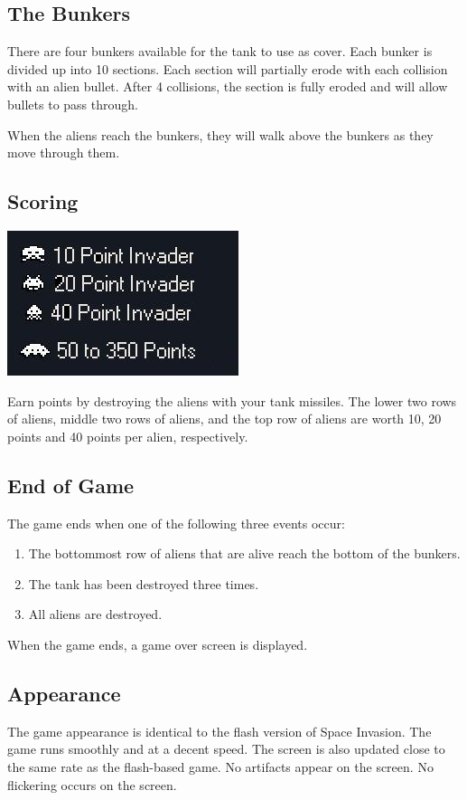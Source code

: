 \documentclass[11pt,letter,oneside]{report}
\begin{document}
\subsection{The Bunkers}
There are four bunkers available for the tank to use as cover.  Each bunker is divided up into 10 sections.  Each section will partially erode with each collision with an alien bullet.  After 4 collisions, the section is fully eroded and will allow bullets to pass through.

When the aliens reach the bunkers, they will walk above the bunkers as they move through them.


\subsection{Scoring}
\includegraphics[]{scoring.jpg}

Earn points by destroying the aliens with your tank missiles. The lower two rows of aliens, middle two rows of aliens, and the top row of aliens are worth 10, 20 points and 40 points per alien, respectively.

\subsection{End of Game}
The game ends when one of the following three events occur:
\begin{enumerate}
\item The bottommost row of aliens that are alive reach the bottom of the bunkers.
\item The tank has been destroyed three times.
\item All aliens are destroyed.
\end{enumerate}
When the game ends, a game over screen is displayed.

\subsection{Appearance}
The game appearance is identical to the flash version of Space Invasion. The game runs smoothly and at a decent speed. The screen is also updated close to the same rate as the flash-based game. No artifacts appear on the screen. No flickering occurs on the screen.
\end{document}
